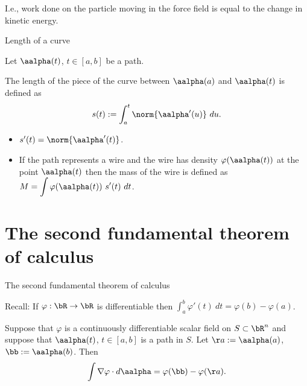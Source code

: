     {I.e.,}
    work done on the particle moving in the force field is equal to the change in kinetic energy.





    {Length of a curve}

    Let \(\aalpha(t)\), \(t\in [a,b]\) be a path.
    \begin{definition}
        The length of the piece of the curve between \(\aalpha(a)\) and \(\aalpha(t)\) is defined as
        \[
            s(t) := \int_a^t \norm{\aalpha'(u)} \ du.
        \]
    \end{definition}

    \begin{itemize}
        \item  \(s'(t) = \norm{\aalpha'(t)} \).
        \item If the path represents a wire and the wire has density \(\varphi(\aalpha(t))\) at the point \(\aalpha(t)\) then the mass of the wire is defined as
              \(M = \displaystyle\int \varphi(\aalpha(t)) \ s'(t) \ dt\).
    \end{itemize}







\section{The second fundamental theorem of calculus}



    {The second fundamental theorem of calculus}


    {Recall:}
    If \(\varphi:\bR \to \bR\) is differentiable then
    \(\int_a^b \varphi'(t) \ dt = \varphi(b) - \varphi(a)\).

    \begin{theorem}
        Suppose that \(\varphi\) is a continuously differentiable scalar field on \(S \subset \bR^n\)
        and suppose that \(\aalpha(t)\), \(t\in[a,b]\) is a path in \(S\).
        Let \(\aa:= \aalpha(a)\),  \(\bb:= \aalpha(b)\).
        Then
        \[
            \int \nabla \varphi \cdot d\aalpha = \varphi(\bb) - \varphi(\aa).
        \]
    \end{theorem}

